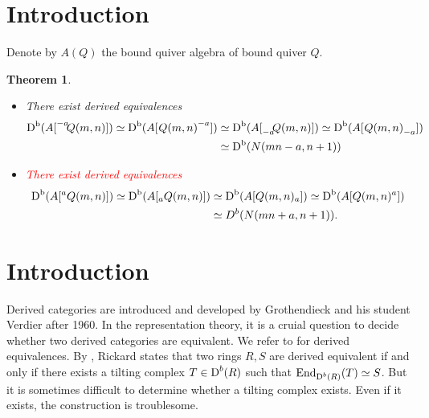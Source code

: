 \documentclass[a4paper, reqno]{amsart}
\newtheorem{thm}{Theorem}[section]
\theoremstyle{definition}
\theoremstyle{remark}
\numberwithin{equation}{section}
\begin{document}
\newpage



\section{Introduction}
Denote by $A(Q)$ the bound quiver algebra of bound quiver $Q$.

\begin{thm}
    \begin{itemize}
    \item[(1)]There exist derived equivalences
    \begin{align*}
        \textup{D}^{\textup{b}}(A[{\vphantom{Q(m,n)}}^{-a}\negmedspace{Q(m,n)}]) \simeq \textup{D}^{\textup{b}}(A[\;{\vphantom{Q(m,n)}}\negmedspace{Q(m,n)}^{-a}]) &\simeq \textup{D}^{\textup{b}}(A[{\vphantom{Q(m,n)}}_{-a}\negmedspace{Q(m,n)}])\simeq \textup{D}^{\textup{b}}(A[\;{\vphantom{Q(m,n)}}\negmedspace{Q(m,n)}_{-a}])\\
        &\simeq\textup{D}^{\textup{b}}( N(mn-a,n+1))
    \end{align*}
    \item[(2)]\textcolor{red}{There exist derived equivalences}
    \begin{align*}
        \textup{D}^{\textup{b}}(A[^{a}Q(m,n)]) \simeq \textup{D}^{\textup{b}}(A[_{a}Q(m,n)])&\simeq  \textup{D}^{\textup{b}}(A[Q(m,n)_{a}]) \simeq \textup{D}^{\textup{b}}(A[Q(m,n)^{a}])\\&\simeq  D^{b}(N(mn+a,n+1)).
    \end{align*}   
    \end{itemize}
\end{thm}
\newpage

\section{Introduction}

Derived categories are introduced and developed by Grothendieck and his student Verdier \cite{Verd} after 1960. In the representation theory, it is a cruial question to decide whether two derived categories are equivalent. We refer to \cite{TiltBook,Kel1994,Ric1989,Ric1991} for derived equivalences. By \cite{Ric1989}, Rickard states that two rings $R,S$ are derived equivalent if and only if there exists a tilting complex $T\in\textup{D}^{b}(R)$ such that $\textup{End}_{\textup{D}^{b}(R)}(T)\simeq S$. But it is sometimes difficult to determine whether a tilting complex exists. Even if it exists, the construction is troublesome.
\end{document}
